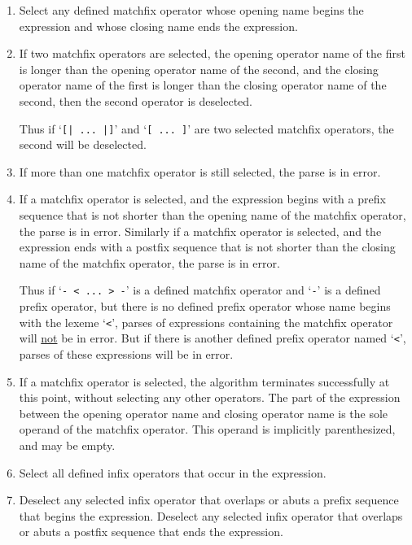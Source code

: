 \documentclass[12pt]{article}
\begin{document}
\begin{enumerate}

\item
Select any defined matchfix operator whose opening name
begins the expression and whose closing name ends the expression.

\item
If two matchfix operators are selected, the opening operator name
of the first is longer than the opening operator name of the second,
and the closing operator name
of the first is longer than the closing operator name of the second,
then the second operator is deselected.

Thus if `\verb/[| ... |]/' and `\verb/[ ... ]/' are two selected
matchfix operators, the second will be deselected.

\item
If more than one matchfix operator is still selected, the parse is in error.

\item
If a matchfix operator is selected, and the expression begins with
a prefix sequence that is not shorter than the opening name of the
matchfix operator, the parse is in error.
Similarly if a matchfix operator is selected, and the expression ends with
a postfix sequence that is not shorter than the closing name of the
matchfix operator, the parse is in error.

Thus if `\verb|- < ... > -|' is a defined matchfix operator and
`\verb|-|' is a defined prefix operator, but there is no defined
prefix operator whose name begins with the lexeme `\verb|<|',
parses of expressions containing the matchfix operator
will \underline{not} be in error.
But if there is another defined prefix operator named `\verb|<|',
parses of these expressions will be in error.

\item
If a matchfix operator is selected, the algorithm terminates successfully
at this point, without selecting any other operators.
The part of the expression between the opening operator name and closing
operator name is the sole operand of the matchfix operator.  This operand
is implicitly parenthesized, and may be empty.

\item
Select all defined infix operators that occur in the expression.

\item
Deselect any selected infix operator that overlaps or abuts
a prefix sequence that begins the expression.
Deselect any selected infix operator that overlaps or abuts
a postfix sequence that ends the expression.


\end{enumerate}
\end{document}
